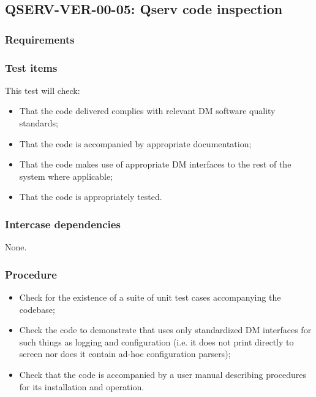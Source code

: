 \subsection{\textsc{QSERV-VER-00-05}: Qserv code inspection}
\label{qserv-ver-00-05}

\subsubsection{Requirements}

\subsubsection{Test items}

This test will check:

\begin{itemize}
  \item{That the code delivered complies with relevant DM software quality standards;}
  \item{That the code is accompanied by appropriate documentation;}
  \item{That the code makes use of appropriate DM interfaces to the rest of the system where applicable;}
  \item{That the code is appropriately tested.}
\end{itemize}

\subsubsection{Intercase dependencies}

None.

\subsubsection{Procedure}

\begin{itemize}

  \item{Check for the existence of a suite of unit test cases accompanying the codebase;}

  \item{Check the code to demonstrate that uses only standardized DM interfaces for such things as logging
  and configuration (i.e. it does not print directly to screen nor does it contain ad-hoc configuration
  parsers);}

  \item{Check that the code is accompanied by a user manual describing procedures for its installation and
  operation.}

\end{itemize}
